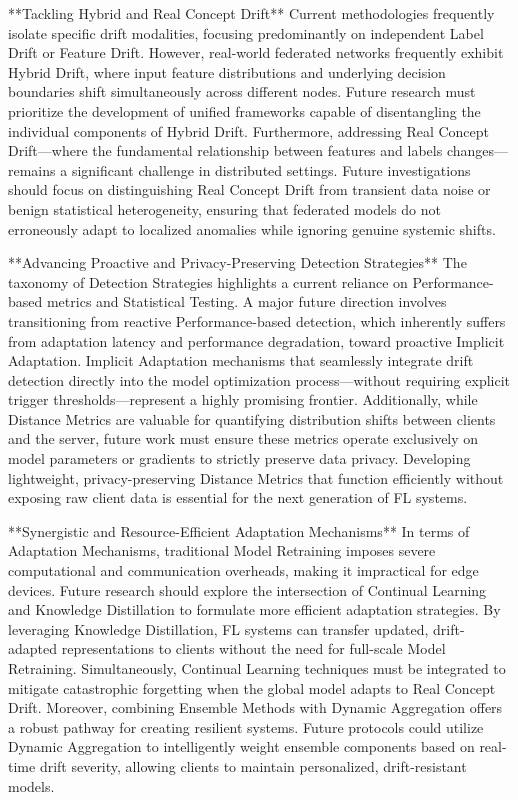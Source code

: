 \documentclass[journal]{IEEEtran}
\begin{document}
**Tackling Hybrid and Real Concept Drift**
Current methodologies frequently isolate specific drift modalities, focusing predominantly on independent Label Drift or Feature Drift. However, real-world federated networks frequently exhibit Hybrid Drift, where input feature distributions and underlying decision boundaries shift simultaneously across different nodes. Future research must prioritize the development of unified frameworks capable of disentangling the individual components of Hybrid Drift. Furthermore, addressing Real Concept Drift—where the fundamental relationship between features and labels changes—remains a significant challenge in distributed settings. Future investigations should focus on distinguishing Real Concept Drift from transient data noise or benign statistical heterogeneity, ensuring that federated models do not erroneously adapt to localized anomalies while ignoring genuine systemic shifts.

**Advancing Proactive and Privacy-Preserving Detection Strategies**
The taxonomy of Detection Strategies highlights a current reliance on Performance-based metrics and Statistical Testing. A major future direction involves transitioning from reactive Performance-based detection, which inherently suffers from adaptation latency and performance degradation, toward proactive Implicit Adaptation. Implicit Adaptation mechanisms that seamlessly integrate drift detection directly into the model optimization process—without requiring explicit trigger thresholds—represent a highly promising frontier. Additionally, while Distance Metrics are valuable for quantifying distribution shifts between clients and the server, future work must ensure these metrics operate exclusively on model parameters or gradients to strictly preserve data privacy. Developing lightweight, privacy-preserving Distance Metrics that function efficiently without exposing raw client data is essential for the next generation of FL systems.

**Synergistic and Resource-Efficient Adaptation Mechanisms**
In terms of Adaptation Mechanisms, traditional Model Retraining imposes severe computational and communication overheads, making it impractical for edge devices. Future research should explore the intersection of Continual Learning and Knowledge Distillation to formulate more efficient adaptation strategies. By leveraging Knowledge Distillation, FL systems can transfer updated, drift-adapted representations to clients without the need for full-scale Model Retraining. Simultaneously, Continual Learning techniques must be integrated to mitigate catastrophic forgetting when the global model adapts to Real Concept Drift. Moreover, combining Ensemble Methods with Dynamic Aggregation offers a robust pathway for creating resilient systems. Future protocols could utilize Dynamic Aggregation to intelligently weight ensemble components based on real-time drift severity, allowing clients to maintain personalized, drift-resistant models.
\end{document}
